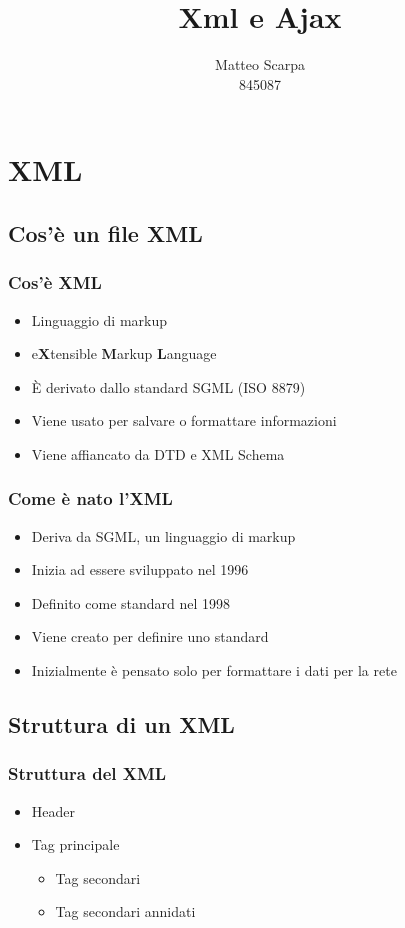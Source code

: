 \documentclass{beamer}
\title{Xml e Ajax}
\author{Matteo Scarpa\\ 845087}
\date{}
\institute{Università Ca'Foscari}
\begin{document}
\begin{frame}
   \maketitle
\end{frame}

\section{XML}

\subsection{Cos'è un file XML}
\begin{frame}
    \frametitle{Cos'è XML}
    \begin{itemize}
        \item Linguaggio di markup
        \item e\textbf{X}tensible \textbf{M}arkup \textbf{L}anguage
        \item È derivato dallo standard SGML (ISO 8879)
        \item Viene usato per salvare o formattare informazioni
        \item Viene affiancato da DTD e XML Schema
    \end{itemize}
\end{frame}

\begin{frame}
    \frametitle{Come è nato l'XML}
    \begin{itemize}
    \item Deriva da SGML, un linguaggio di markup
    \item Inizia ad essere sviluppato nel 1996
    \item Definito come standard nel 1998
    \item Viene creato per definire uno standard
    \item Inizialmente è pensato solo per formattare i dati per la rete
    \end{itemize}

\end{frame}

\subsection{Struttura di un XML}
\begin{frame}
    \frametitle{Struttura del XML}
    \begin{itemize}
        \item Header
        \item Tag principale
        \begin{itemize}
            \item Tag secondari
            \item Tag secondari annidati
        \end{itemize}
    \end{itemize}
\end{frame}
\end{document}
